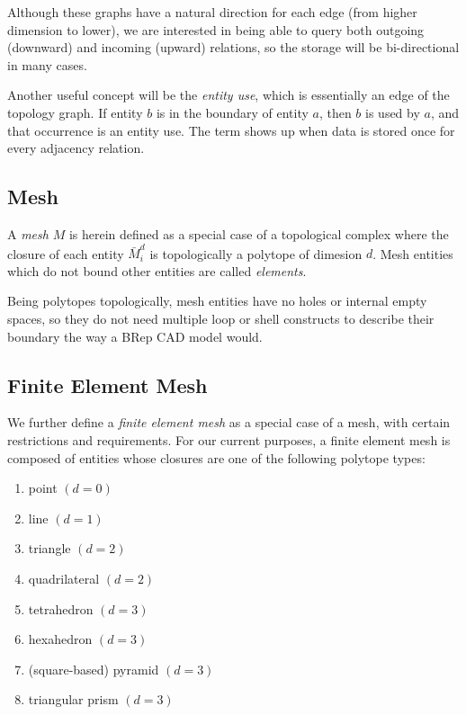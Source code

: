 Although these graphs have a natural direction for each
edge (from higher dimension to lower), we are interested
in being able to query both outgoing (downward) and
incoming (upward) relations, so the storage will be
bi-directional in many cases.

Another useful concept will be the {\it entity use},
which is essentially an edge of the topology graph.
If entity $b$ is in the boundary of entity $a$, then
$b$ is used by $a$, and that occurrence is an entity use.
The term shows up when data is stored once for every adjacency relation.

\subsection{Mesh}
\label{sec:def_mesh}

A {\it mesh} $M$ is herein defined as a special case of a topological
complex where the closure of each entity $\bar{M}^d_i$
is topologically a polytope of dimesion $d$.
Mesh entities which do not bound other entities
are called \emph{elements}.

Being polytopes topologically, mesh entities have no
holes or internal empty spaces,
so they do not need multiple loop or shell constructs to
describe their boundary the way a BRep CAD model would.

\subsection{Finite Element Mesh}
\label{sec:def_fem}

We further define a {\it finite element mesh} as a special case
of a mesh, with certain restrictions and requirements.
For our current purposes, a finite element mesh is composed
of entities whose closures are one of the following
polytope types:

\begin{enumerate}
\item point $(d = 0)$
\item line $(d = 1)$
\item triangle $(d = 2)$
\item quadrilateral $(d = 2)$
\item tetrahedron $(d = 3)$
\item hexahedron $(d = 3)$
\item (square-based) pyramid $(d = 3)$
\item triangular prism $(d = 3)$
\end{enumerate}

